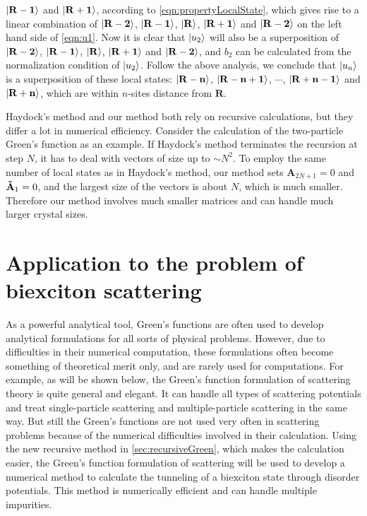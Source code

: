 $|  \mathbf{R-1} \rangle$ and $|  \mathbf{R+1} \rangle$, according to
 \autoref{eqn:propertyLocalState}, which gives rise to a linear combination of $|  \mathbf{R-2} \rangle$, 
$|  \mathbf{R-1} \rangle$, $|  \mathbf{R} \rangle$, $|  \mathbf{R+1} \rangle$ and $|  \mathbf{R-2} \rangle$ on the left hand side
 of \autoref{eqn:u1}. Now it is clear that $| u_2 \rangle$ will also be a superposition of $|  \mathbf{R-2} \rangle$, 
$|  \mathbf{R-1} \rangle$, $|  \mathbf{R} \rangle$, $|  \mathbf{R+1} \rangle$ and $|  \mathbf{R-2} \rangle$, and $b_2$ can be
calculated from the normalization condition of $| u_2 \rangle$. Follow the above analysis, we conclude that 
$| u_n \rangle$ is a superposition of these local states: $|  \mathbf{R-n} \rangle$, 
$|  \mathbf{R-n+1} \rangle$, $\cdots$, $|  \mathbf{R+n-1} \rangle$ and $|  \mathbf{R+n} \rangle$, which are within $n$-sites
distance from $\mathbf{R}$. 

Haydock's method and our method both rely on recursive calculations, but they differ a lot in numerical efficiency. 
Consider the calculation of the two-particle Green's function as an example.  If Haydock's 
method terminates the recursion at step $N$, it has to deal with vectors of size up to $\sim N^2$. 
To employ 
the same number of local states as in Haydock's method, our method sets $\mathbf{A}_{2N+1}=0$ and
 $\mathbf{\Tilde{A} }_{1}=0$, and the largest size of the vectors is about $N$, which is much smaller. Therefore
our method involves much smaller matrices and can handle much larger crystal sizes. 




\section{Application to the problem of biexciton scattering}
\label{sec:biexcitonScattering}

As a powerful analytical tool, Green's functions are often used to develop analytical formulations for  all sorts of physical 
problems. 
However, due to difficulties in their numerical computation, 
these formulations often become something of  theoretical merit only, and are rarely used for computations. For example, as will be shown below, the Green's function formulation of scattering theory is quite general and 
elegant. It 
can handle all types of scattering potentials and treat  single-particle scattering and multiple-particle scattering in the
 same way. But still the Green's functions are not used very often in scattering problems because of the numerical difficulties
 involved in their calculation\cite{Berciu2010}.  Using the new recursive
 method in \autoref{sec:recursiveGreen}, which makes the calculation easier,  the Green's
 function formulation of scattering will be used to develop a numerical method to calculate the tunneling of a biexciton state through 
 disorder potentials. This method is numerically efficient and can handle multiple impurities. 

